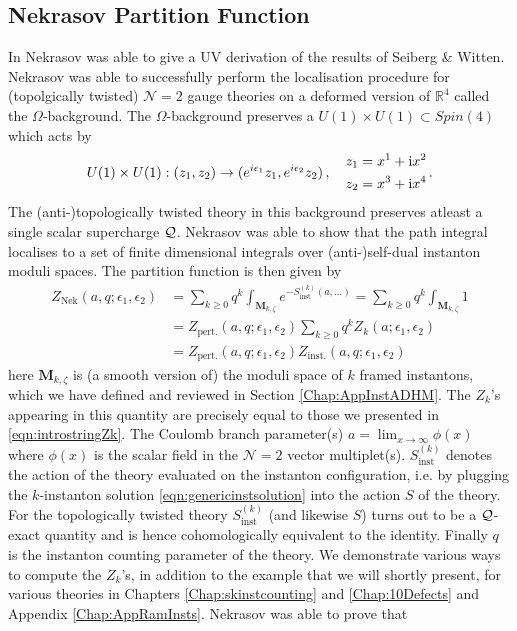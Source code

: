 \documentclass[main.tex]{subfiles}
\begin{document}
\subsection{Nekrasov Partition Function}\label{sec:intronekpart}
In \cite{Nekrasov:2003rj,Nekrasov:2002qd} Nekrasov was able to give a UV derivation of the results of Seiberg \& Witten.  Nekrasov was able to successfully perform the localisation procedure for (topolgically twisted) $\mathcal{N}=2$ gauge theories on a deformed version of $\mathbb{R}^4$ called the $\Omega$-background.  The $\Omega$-background preserves a $U(1)\times U(1)\subset Spin(4)$ which acts by
\begin{equation}
U(1)\times U(1):(z_1,z_2)\to(e^{i\epsilon_1}z_1,e^{i\epsilon_2}z_2)\,,\quad \begin{aligned}&z_1=x^1+\mathrm{i} x^2\\&z_2=x^3+\mathrm{i} x^4\end{aligned}\,.
\end{equation}
The (anti-)topologically twisted theory \cite{Witten:1988ze} in this background preserves atleast a single scalar supercharge $\mathcal{Q}$.  Nekrasov was able to show that the path integral localises to a set of finite dimensional integrals over (anti-)self-dual instanton moduli spaces.  The partition function is then given by
\begin{equation}
\begin{aligned}\label{eqn:Znek22}
Z_{\text{Nek}}(a,q;\epsilon_1,\epsilon_2)&=\sum_{k\geq0}q^k\int_{\mathbf{M}_{k,\zeta}}e^{-S^{(k)}_{\text{inst}}(a,\dots)}=\sum_{k\geq0}q^k\int_{\mathbf{M}_{k,\zeta}}1\\
&=Z_{\text{pert.}}(a,q;\epsilon_1,\epsilon_2)\sum_{k\geq0}q^kZ_k(a;\epsilon_1,\epsilon_2)\\
&=Z_{\text{pert.}}(a,q;\epsilon_1,\epsilon_2)Z_{\text{inst.}}(a,q;\epsilon_1,\epsilon_2)
\end{aligned}
\end{equation}
here $\mathbf{M}_{k,\zeta}$ is (a smooth version of) the moduli space of $k$ framed instantons, which we have defined and reviewed in Section \ref{Chap:AppInstADHM}.  The $Z_k$'s appearing in this quantity are precisely equal to those we presented in \eqref{eqn:introstringZk}.  The Coulomb branch parameter(s) $a=\lim_{x\to\infty}\phi(x)$ where $\phi(x)$ is the scalar field in the $\mathcal{N}=2$ vector multiplet(s).  $S^{(k)}_{\text{inst}}$ denotes the action of the theory evaluated on the instanton configuration, i.e.  by plugging the $k$-instanton solution \eqref{eqn:genericinstsolution} into the action $S$ of the theory.  For the topologically twisted theory $S^{(k)}_{\text{inst}}$ (and likewise $S$) turns out to be a $\mathcal{Q}$-exact quantity and is hence cohomologically equivalent to the identity.  Finally $q$ is the instanton counting parameter of the theory.  We demonstrate various ways to compute the $Z_k$'s, in addition to the example that we will shortly present, for various theories in Chapters \ref{Chap:skinstcounting} and \ref{Chap:10Defects} and Appendix \ref{Chap:AppRamInsts}.  Nekrasov was able to prove that
\end{document}
